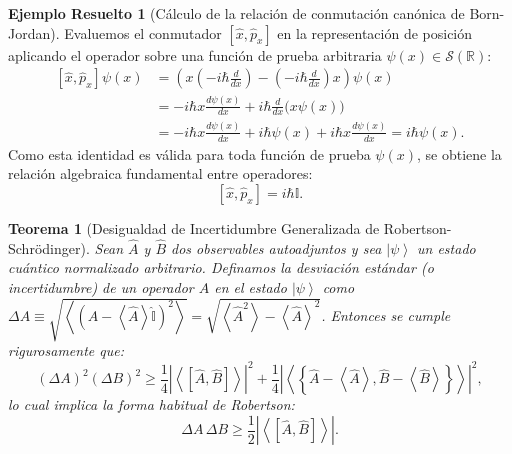 \documentclass[11pt,a4paper,twoside]{report}
\theoremstyle{definition}
\newtheorem{ejemplo}{Ejemplo Resuelto}[chapter]
\theoremstyle{plain}
\newtheorem{teorema}{Teorema}[chapter]
\theoremstyle{remark}
\newcommand{\ket}[1]{\left| #1 \right\rangle}
\newcommand{\expval}[1]{\left\langle #1 \right\rangle}
\newcommand{\comm}[2]{\left[ #1, #2 \right]}
\newcommand{\acomm}[2]{\left\{ #1, #2 \right\}}
\newcommand{\op}[1]{\hat{#1}}
\newcommand{\ident}{\hat{\mathbb{I}}}
\begin{document}
\begin{ejemplo}[Cálculo de la relación de conmutación canónica de Born-Jordan]
Evaluemos el conmutador $\comm{\op{x}}{\op{p}_x}$ en la representación de posición aplicando el operador sobre una función de prueba arbitraria $\psi(x) \in \mathcal{S}(\mathbb{R})$:
\begin{align}
    \comm{\op{x}}{\op{p}_x}\psi(x) &= \left( x \left(-i\hbar \frac{d}{dx}\right) - \left(-i\hbar \frac{d}{dx}\right) x \right)\psi(x) \nonumber \\
    &= -i\hbar x \frac{d\psi(x)}{dx} + i\hbar \frac{d}{dx}\big(x\psi(x)\big) \nonumber \\
    &= -i\hbar x \frac{d\psi(x)}{dx} + i\hbar \psi(x) + i\hbar x \frac{d\psi(x)}{dx} = i\hbar \psi(x).
\end{align}
Como esta identidad es válida para toda función de prueba $\psi(x)$, se obtiene la relación algebraica fundamental entre operadores:
\begin{equation}
    \comm{\op{x}}{\op{p}_x} = i\hbar \ident.
\end{equation}
\end{ejemplo}

\begin{teorema}[Desigualdad de Incertidumbre Generalizada de Robertson-Schrödinger]
Sean $\op{A}$ y $\op{B}$ dos observables autoadjuntos y sea $\ket{\psi}$ un estado cuántico normalizado arbitrario. Definamos la desviación estándar (o incertidumbre) de un operador $\op{A}$ en el estado $\ket{\psi}$ como $\Delta A \equiv \sqrt{\expval{(\op{A} - \expval{\op{A}}\ident)^2}} = \sqrt{\expval{\op{A}^2} - \expval{\op{A}}^2}$. Entonces se cumple rigurosamente que:
\begin{equation}
    (\Delta A)^2 (\Delta B)^2 \ge \frac{1}{4}\left| \expval{\comm{\op{A}}{\op{B}}} \right|^2 + \frac{1}{4}\left| \expval{\acomm{\op{A}-\expval{\op{A}}}{\op{B}-\expval{\op{B}}}} \right|^2,
\end{equation}
lo cual implica la forma habitual de Robertson:
\begin{equation}
    \Delta A \, \Delta B \ge \frac{1}{2} \left| \expval{\comm{\op{A}}{\op{B}}} \right|.
\end{equation}
\end{teorema}
\end{document}
